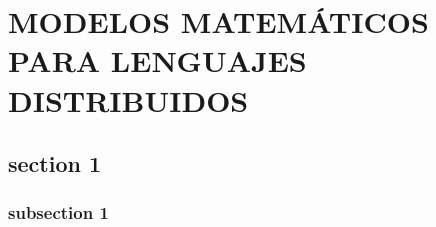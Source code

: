\chapter{MODELOS MATEMÁTICOS PARA LENGUAJES DISTRIBUIDOS}
\section{section 1}
\subsection{subsection 1}
